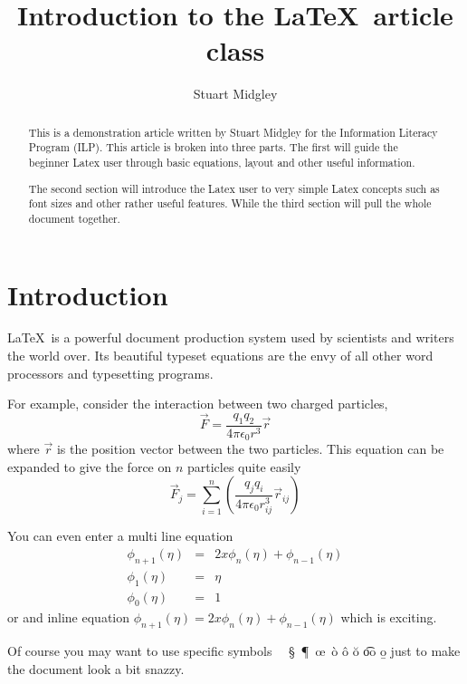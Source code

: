 \documentclass[a4paper,12pt,twocolumn]{article}
\begin{document}
\author{Stuart Midgley}
\title{Introduction to the \LaTeX\ article class}
\maketitle
\begin{abstract}
This is a demonstration article written by Stuart Midgley for the Information Literacy Program (ILP).  This article is broken into three parts.  The first will guide the beginner Latex user through basic equations, layout and other useful information.

The second section will introduce the Latex user to very simple Latex concepts such as font sizes and other rather useful features.  While the third section will pull the whole document together.
\end{abstract}
\section{Introduction}
\LaTeX\ is a powerful document production system used by scientists and writers the world over.  Its beautiful typeset equations are the envy of all other word processors and typesetting programs.

For example, consider the interaction between two charged particles,
\begin{equation}
\vec{F} = \frac{q_{1} q_{2}}{4 \pi \epsilon_{0}{r}^{3}}\vec{r}
\end{equation}
where $\vec{r}$ is the position vector between the two particles.  This equation can be expanded to give the force on $n$ particles quite easily
\begin{equation}
\vec{F}_{j} = \sum_{i=1}^{n} \left( \frac{q_{j} q_{i}}{4 \pi \epsilon_{0} r_{ij}^{3}} \vec{r}_{ij} \right)
\end{equation}

You can even enter a multi line equation
\begin{eqnarray}
\phi_{n+1}(\eta) &  = & 2 x \phi_{n}(\eta)  + \phi_{n-1}(\eta)  \\
\phi_{1}(\eta)  & = & \eta  \\
\phi_{0}(\eta)  & = & 1
\end{eqnarray}
or and inline equation $\phi_{n+1}(\eta) = 2 x \phi_{n}(\eta)  + \phi_{n-1}(\eta)$ which is exciting.

Of course you may want to use specific symbols \dag\ \ddag\ \S\ \P\ \oe\ \`{o} \^{o} \u{o} \t{oo} \b{o} just to make the document look a bit snazzy.
\end{document}
